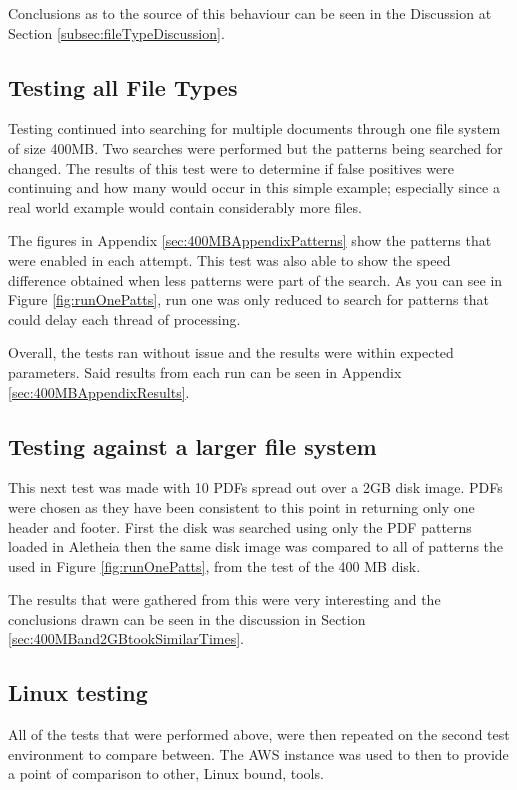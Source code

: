 Conclusions as to the source of this behaviour can be seen in the Discussion at Section \ref{subsec:fileTypeDiscussion}.

\subsection{Testing all File Types}
\label{sec:AllFileTypes}
Testing continued into searching for multiple documents through one file system of size 400\ac{MB}.
Two searches were performed but the patterns being searched for changed.
The results of this test were to determine if false positives were continuing and how many would occur in this simple example;
especially since a real world example would contain considerably more files.

The figures in Appendix \ref{sec:400MBAppendixPatterns} show the patterns that were enabled in each attempt.
This test was also able to show the speed difference obtained when less patterns were part of the search.
As you can see in Figure \ref{fig:runOnePatts}, run one was only reduced to search for patterns that could delay each thread of processing.

Overall, the tests ran without issue and the results were within expected parameters.
Said results from each run can be seen in Appendix \ref{sec:400MBAppendixResults}.

\subsection{Testing against a larger file system}
This next test was made with 10 PDFs spread out over a 2\ac{GB} disk image.
PDFs were chosen as they have been consistent to this point in returning only one header and footer.
First the disk was searched using only the PDF patterns loaded in Aletheia then the same disk image was compared to all of patterns the used in Figure \ref{fig:runOnePatts}, from the test of the 400 \ac{MB} disk.

The results that were gathered from this were very interesting and the conclusions drawn can be seen in the discussion in Section \ref{sec:400MBand2GBtookSimilarTimes}.

\subsection{Linux testing}
\label{sec:linuxResults}
All of the tests that were performed above, were then repeated on the second test environment to compare between.
The \ac{AWS} instance was used to then to provide a point of comparison to other, Linux bound, tools.

